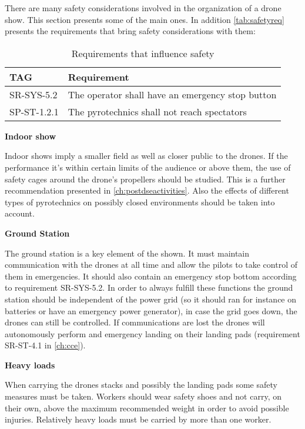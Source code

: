 There are many safety considerations involved in the organization of a drone show. This section presents some of the main ones. In addition \autoref{tab:safetyreq} presents the requirements that bring safety considerations with them:

\begin{table}[h]
\centering
\caption{Requirements that influence safety}
\label{tab:safetyreq}
\begin{tabular}{|p{2cm}|p{10cm}|}
\hline
\textbf{TAG} & \textbf{Requirement} \\ \hline
SR-SYS-5.2 & The operator shall have an emergency stop button \\ \hline
SP-ST-1.2.1 & The pyrotechnics shall not reach spectators\\ \hline
\end{tabular}%
\end{table}

\textbf{Indoor show} 

Indoor shows imply a smaller field as well as closer public to the drones. If the performance it's within certain limits of the audience or above them, the use of safety cages around the drone's propellers should be studied. This is a further recommendation presented in \autoref{ch:postdseactivities}. Also the effects of different types of pyrotechnics on possibly closed environments should be taken into account.


\textbf{Ground Station}

The ground station is a key element of the shown. It must maintain communication with the drones at all time and allow the pilots to take control of them in emergencies. It should also contain an emergency stop bottom according to requirement SR-SYS-5.2. In order to always fulfill these functions the ground station should be independent of the power grid (so it should ran for instance on batteries or have an emergency power generator), in case the grid goes down, the drones can still be controlled. If communications are lost the drones will autonomously perform and emergency landing on their landing pads (requirement SR-ST-4.1 in \autoref{ch:cce}).


\textbf{Heavy loads}

When carrying the drones stacks and possibly the landing pads some safety measures must be taken. Workers should wear safety shoes and not carry, on their own, above the maximum recommended weight in order to avoid possible injuries. Relatively heavy loads must be carried by more than one worker.


